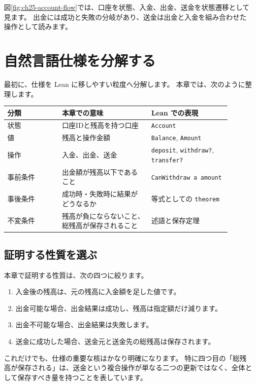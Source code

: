 
図\ref{fig:ch25-account-flow}では、口座を状態、入金、出金、送金を状態遷移として見ます。
出金には成功と失敗の分岐があり、送金は出金と入金を組み合わせた操作として読みます。

\section{自然言語仕様を分解する}

最初に、仕様を Lean に移しやすい粒度へ分解します。
本章では、次のように整理します。

\begin{longtable}{p{0.22\linewidth}p{0.36\linewidth}p{0.32\linewidth}}
\toprule
分類 & 本章での意味 & Lean での表現 \\
\midrule
状態 & 口座IDと残高を持つ口座 & \texttt{Account} \\
値 & 残高と操作金額 & \texttt{Balance}, \texttt{Amount} \\
操作 & 入金、出金、送金 & \texttt{deposit}, \texttt{withdraw?}, \texttt{transfer?} \\
事前条件 & 出金額が残高以下であること & \texttt{CanWithdraw a amount} \\
事後条件 & 成功時・失敗時に結果がどうなるか & 等式としての \texttt{theorem} \\
不変条件 & 残高が負にならないこと、総残高が保存されること & 述語と保存定理 \\
\bottomrule
\end{longtable}

\subsection{証明する性質を選ぶ}

本章で証明する性質は、次の四つに絞ります。

\begin{enumerate}
\item 入金後の残高は、元の残高に入金額を足した値です。
\item 出金可能な場合、出金結果は成功し、残高は指定額だけ減ります。
\item 出金不可能な場合、出金結果は失敗します。
\item 送金に成功した場合、送金元と送金先の総残高は保存されます。
\end{enumerate}

これだけでも、仕様の重要な核はかなり明確になります。
特に四つ目の「総残高が保存される」は、送金という複合操作が単なる二つの更新ではなく、全体として保存すべき量を持つことを表しています。

